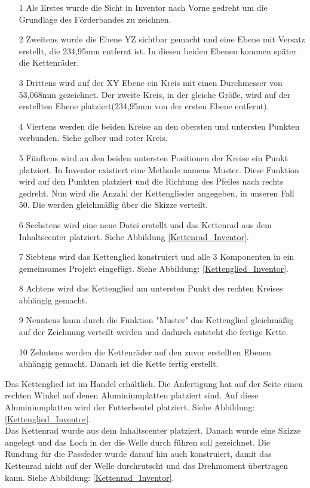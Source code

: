 \begin{itemize}
\item[1] Als Erstes wurde die Sicht in Inventor nach Vorne gedreht um die Grundlage des Förderbandes zu zeichnen.
\item[2] Zweitens wurde die Ebene YZ sichtbar gemacht und eine Ebene mit Versatz erstellt, die 234,95mm entfernt ist. In diesen beiden Ebenen kommen später die Kettenräder.
\item[3] Drittens wird auf der XY Ebene ein Kreis mit einen Durchmesser von 53,068mm gezeichnet. Der zweite Kreis, in der gleiche Größe, wird auf der erstellten Ebene platziert(234,95mm von der ersten Ebene entfernt). 
\item[4] Viertens werden die beiden Kreise an den obersten und untersten Punkten verbunden. Siehe gelber und roter Kreis.
\item[5] Fünftens wird an den beiden untersten Positionen der Kreise ein Punkt platziert. In Inventor existiert eine Methode namens Muster. Diese Funktion wird auf den Punkten platziert und die Richtung des Pfeiles nach rechts gedreht. Nun wird die Anzahl der Kettenglieder angegeben, in unseren Fall 50. Die werden gleichmäßig über die Skizze verteilt.
\item[6] Sechstens wird eine neue Datei erstellt und das Kettenrad aus dem Inhaltscenter platziert. Siehe Abbildung \ref{Kettenrad_Inventor}.
\item[7] Siebtens wird das Kettenglied konstruiert und alle 3 Komponenten in ein gemeinsames Projekt eingefügt. Siehe Abbildung: \ref{Kettenglied_Inventor}.
\item[8] Achtens wird das Kettenglied am untersten Punkt des rechten Kreises abhängig gemacht.
\item[9] Neuntens kann durch die Funktion "Muster" das Kettenglied gleichmäßig auf der Zeichnung verteilt werden und dadurch entsteht die fertige Kette.
\item[10] Zehntens werden die Kettenräder auf den zuvor erstellten Ebenen abhängig gemacht. Danach ist die Kette fertig erstellt.\\
\end{itemize}

Das Kettenglied ist im Handel erhältlich. Die Anfertigung hat auf der Seite einen rechten Winkel auf denen Aluminiumplatten platziert sind. Auf diese Aluminiumplatten wird der Futterbeutel platziert. Siehe Abbildung: \ref{Kettenglied_Inventor}.\\

Das Kettenrad wurde aus dem Inhaltscenter platziert. Danach wurde eine Skizze angelegt und das Loch in der die Welle durch führen soll gezeichnet. Die Rundung für die Passfeder wurde darauf hin auch konstruiert, damit das Kettenrad nicht auf der Welle durchrutscht und das Drehmoment übertragen kann. Siehe Abbildung: \ref{Kettenrad_Inventor}.

